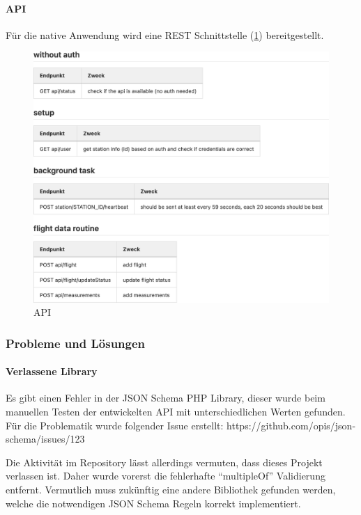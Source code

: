 \newpage

\paragraph{API}
Für die native Anwendung wird eine REST Schnittstelle (\ref{fig:api}) bereitgestellt.

\begin{figure}[h!]
    \centering
    \caption{API}
    \label{fig:api}
    \includegraphics[scale=0.55]{assets/api}
\end{figure}
\newpage

\subsubsection{Probleme und Lösungen}

\paragraph{Verlassene Library}
Es gibt einen Fehler in der JSON Schema PHP Library, dieser wurde beim manuellen Testen der entwickelten API mit unterschiedlichen Werten gefunden.
Für die Problematik wurde folgender Issue erstellt: https://github.com/opis/json-schema/issues/123

Die Aktivität im Repository lässt allerdings vermuten, dass dieses Projekt verlassen ist.
Daher wurde vorerst die fehlerhafte \enquote{multipleOf} Validierung entfernt.
Vermutlich muss zukünftig eine andere Bibliothek gefunden werden, welche die notwendigen JSON Schema Regeln korrekt implementiert.

